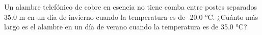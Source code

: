 \item Un alambre telefónico de cobre en esencia no tiene comba entre postes separados 35.0 m en un día de invierno cuando la temperatura es de -20.0 °C. ¿Cuánto más largo es el alambre en un día de verano cuando la temperatura es de 35.0 °C?
